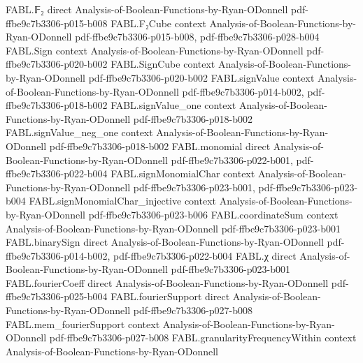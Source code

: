\begin{theorem}
\label{FABL.amplificationRepetitions_queryBound}
\leanok
{}
\proofstep
  {FABL.𝔽₂}
  {direct}
  {Analysis-of-Boolean-Functions-by-Ryan-ODonnell}
  {pdf-ffbe9c7b3306-p015-b008}
\proofstep
  {FABL.F₂Cube}
  {context}
  {Analysis-of-Boolean-Functions-by-Ryan-ODonnell}
  {pdf-ffbe9c7b3306-p015-b008,
    pdf-ffbe9c7b3306-p028-b004}
\proofstep
  {FABL.Sign}
  {context}
  {Analysis-of-Boolean-Functions-by-Ryan-ODonnell}
  {pdf-ffbe9c7b3306-p020-b002}
\proofstep
  {FABL.SignCube}
  {context}
  {Analysis-of-Boolean-Functions-by-Ryan-ODonnell}
  {pdf-ffbe9c7b3306-p020-b002}
\proofstep
  {FABL.signValue}
  {context}
  {Analysis-of-Boolean-Functions-by-Ryan-ODonnell}
  {pdf-ffbe9c7b3306-p014-b002,
    pdf-ffbe9c7b3306-p018-b002}
\proofstep
  {FABL.signValue_one}
  {context}
  {Analysis-of-Boolean-Functions-by-Ryan-ODonnell}
  {pdf-ffbe9c7b3306-p018-b002}
\proofstep
  {FABL.signValue_neg_one}
  {context}
  {Analysis-of-Boolean-Functions-by-Ryan-ODonnell}
  {pdf-ffbe9c7b3306-p018-b002}
\proofstep
  {FABL.monomial}
  {direct}
  {Analysis-of-Boolean-Functions-by-Ryan-ODonnell}
  {pdf-ffbe9c7b3306-p022-b001,
    pdf-ffbe9c7b3306-p022-b004}
\proofstep
  {FABL.signMonomialChar}
  {context}
  {Analysis-of-Boolean-Functions-by-Ryan-ODonnell}
  {pdf-ffbe9c7b3306-p023-b001,
    pdf-ffbe9c7b3306-p023-b004}
\proofstep
  {FABL.signMonomialChar_injective}
  {context}
  {Analysis-of-Boolean-Functions-by-Ryan-ODonnell}
  {pdf-ffbe9c7b3306-p023-b006}
\proofstep
  {FABL.coordinateSum}
  {context}
  {Analysis-of-Boolean-Functions-by-Ryan-ODonnell}
  {pdf-ffbe9c7b3306-p023-b001}
\proofstep
  {FABL.binarySign}
  {direct}
  {Analysis-of-Boolean-Functions-by-Ryan-ODonnell}
  {pdf-ffbe9c7b3306-p014-b002,
    pdf-ffbe9c7b3306-p022-b004}
\proofstep
  {FABL.χ}
  {direct}
  {Analysis-of-Boolean-Functions-by-Ryan-ODonnell}
  {pdf-ffbe9c7b3306-p023-b001}
\proofstep
  {FABL.fourierCoeff}
  {direct}
  {Analysis-of-Boolean-Functions-by-Ryan-ODonnell}
  {pdf-ffbe9c7b3306-p025-b004}
\proofstep
  {FABL.fourierSupport}
  {direct}
  {Analysis-of-Boolean-Functions-by-Ryan-ODonnell}
  {pdf-ffbe9c7b3306-p027-b008}
\proofstep
  {FABL.mem_fourierSupport}
  {context}
  {Analysis-of-Boolean-Functions-by-Ryan-ODonnell}
  {pdf-ffbe9c7b3306-p027-b008}
\proofstep
  {FABL.granularityFrequencyWithin}
  {context}
  {Analysis-of-Boolean-Functions-by-Ryan-ODonnell}

\end{theorem}
